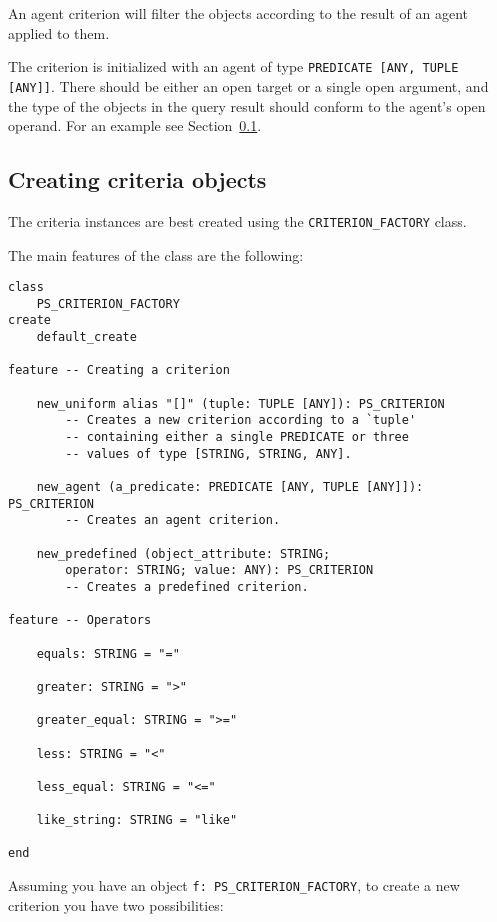 \documentclass[a4paper,12pt]{report}
\begin{document}
An agent criterion will filter the objects according to the result of an agent applied to them.

The criterion is initialized with an agent of type \lstinline!PREDICATE [ANY, TUPLE [ANY]]!. 
There should be either an open target or a single open argument, and the type of the objects in the query result should conform to the agent's open operand. For an example see Section~\ref{sec:creating_criteria_objects}.

\subsection{Creating criteria objects}
\label{sec:creating_criteria_objects}
The criteria instances are best created using the \lstinline!CRITERION_FACTORY! class.

The main features of the class are the following: 

\begin{lstlisting}[language=OOSC2Eiffel, captionpos=b, caption={The CRITERION\_FACTORY class interface}, label={lst:factory_interface}]
class
	PS_CRITERION_FACTORY
create
	default_create

feature -- Creating a criterion

	new_uniform alias "[]" (tuple: TUPLE [ANY]): PS_CRITERION
		-- Creates a new criterion according to a `tuple'
		-- containing either a single PREDICATE or three 
		-- values of type [STRING, STRING, ANY].

	new_agent (a_predicate: PREDICATE [ANY, TUPLE [ANY]]): PS_CRITERION
		-- Creates an agent criterion.

	new_predefined (object_attribute: STRING; 
		operator: STRING; value: ANY): PS_CRITERION
		-- Creates a predefined criterion.

feature -- Operators

	equals: STRING = "="

	greater: STRING = ">"

	greater_equal: STRING = ">="

	less: STRING = "<"

	less_equal: STRING = "<="

	like_string: STRING = "like"

end
\end{lstlisting}

Assuming you have an object \lstinline{f: PS_CRITERION_FACTORY}, to create a new criterion you have two possibilities:
\end{document}
